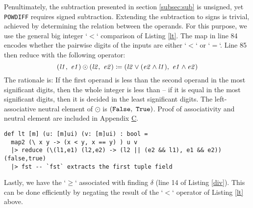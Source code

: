Penultimately, the subtraction presented in section \ref{subsec:sub} is
unsigned, yet \texttt{POWDIFF} requires signed subtraction. Extending the
subtraction to signs is trivial, achieved by determining the relation between
the operands. For this purpose, we use the general big integer `$<$` comparison
of Listing \ref{lt}. The map in line 84 encodes whether the pairwise digits of
the inputs are either `$<$` or `$=$`. Line 85 then reduce with the following
operator:
\begin{equation}
  \label{eq:lt}
  (\mathit{l1},~\mathit{e1}) \odot (\mathit{l2},~\mathit{e2}) \coloneq (\mathit{l2} \lor (\mathit{e2} \land \mathit{l1}),~\mathit{e1} \land \mathit{e2})
\end{equation}
The rationale is: If the first operand is less than the second operand in the
most significant digits, then the whole integer is less than -- if it is equal in
the most significant digits, then it is decided in the least significant
digits. The left-associative neutral element of $\odot$ is
$(\mathtt{False},~\mathtt{True})$. Proof of associativity and neutral
element are included in Appendix \hyperref[app:C]{C}.

\begin{lstlisting}[language=futhark,caption={\footnotesize Futhark function to check $u < v$ in parallel for big integers $u$ and $v$ from file \texttt{helper.fut}.},label={lt},firstnumber=83]
def lt [m] (u: [m]ui) (v: [m]ui) : bool =
  map2 (\ x y -> (x < y, x == y) ) u v
  |> reduce (\(l1,e1) (l2,e2) -> (l2 || (e2 && l1), e1 && e2)) (false,true)
  |> fst -- `fst` extracts the first tuple field
\end{lstlisting}

Lastly, we have the `$\geq$` associated with finding $\delta$ (line 14 of Listing
\ref{div}). This can be done efficiently by negating the result of the `$<$`
operator of Listing \ref{lt} above.

